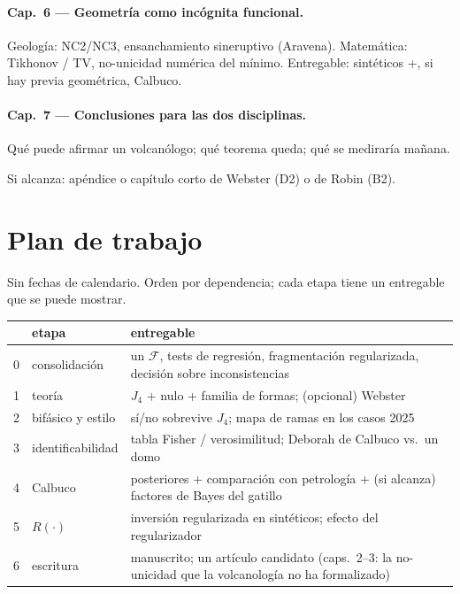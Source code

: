 \documentclass[11pt,a4paper]{article}
\theoremstyle{plain}
\theoremstyle{definition}
\theoremstyle{remark}
\newcommand{\F}{\mathcal{F}}
\begin{document}
\paragraph{Cap.\ 6 --- Geometría como incógnita funcional.}
Geología: NC2/NC3, ensanchamiento sineruptivo (Aravena).
Matemática: Tikhonov / TV, no-unicidad numérica del mínimo.
Entregable: sintéticos +, si hay previa geométrica, Calbuco.

\paragraph{Cap.\ 7 --- Conclusiones para las dos disciplinas.}
Qué puede afirmar un volcanólogo; qué teorema queda; qué se
mediraría mañana.

Si alcanza: apéndice o capítulo corto de Webster (D2) o de Robin
(B2).

\section{Plan de trabajo}
\label{sec:plan}

Sin fechas de calendario. Orden por dependencia; cada etapa tiene
un entregable que se puede mostrar.

\begin{center}
\small
\begin{tabular}{@{}clp{}@{}}
\toprule
 & etapa & entregable \\
\midrule
0 & consolidación &
  un $\F$, tests de regresión, fragmentación regularizada,
  decisión sobre inconsistencias \\
1 & teoría &
  $J_4$ + nulo + familia de formas; (opcional) Webster \\
2 & bifásico y estilo &
  sí/no sobrevive $J_4$; mapa de ramas en los casos 2025 \\
3 & identificabilidad &
  tabla Fisher / verosimilitud; Deborah de Calbuco vs.\ un domo \\
4 & Calbuco &
  posteriores + comparación con petrología + (si alcanza)
  factores de Bayes del gatillo \\
5 & $R(\cdot)$ &
  inversión regularizada en sintéticos; efecto del
  regularizador \\
6 & escritura &
  manuscrito; un artículo candidato (caps.\ 2--3: la
  no-unicidad que la volcanología no ha formalizado) \\
\bottomrule
\end{tabular}
\end{center}
\end{document}
